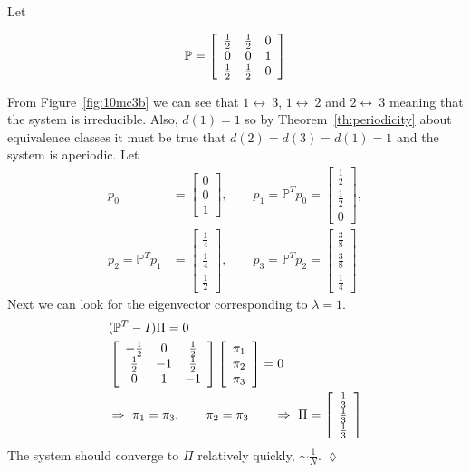 \begin{example}
Let

\begin{equation*}
\mathbb{P} = \left[\begin{array}{c c c} \frac{1}{2} & \frac{1}{2} & 0 \\ 0 & 0 & 1 \\ \frac{1}{2} & \frac{1}{2} & 0 \end{array}\right]
\end{equation*}

From Figure~\ref{fig:10mc3b} we can see that $1\leftrightarrow~3$, $1\leftrightarrow~2$ and $2\leftrightarrow~3$ meaning that the system is irreducible.
Also, $d (1)=1$ so by Theorem~\ref{th:periodicity} about equivalence classes it must be true that $d (2)=d (3)=d (1)=1$ and the system is aperiodic.
Let
\begin{align*}
p_0 &= \left[\begin{array}{c} 0 \\ 0 \\ 1 \end{array}\right],
\qquad p_1 = \mathbb{P}^Tp_0 = \left[\begin{array}{c} \frac{1}{2} \\ \frac{1}{2} \\ 0 \end{array}\right], \\
p_2 = \mathbb{P}^Tp_1 &= \left[\begin{array}{c} \frac{1}{4} \\ \frac{1}{4} \\ \frac{1}{2} \end{array}\right],
\qquad p_3 = \mathbb{P}^Tp_2 = \left[\begin{array}{c} \frac{3}{8} \\ \frac{3}{8} \\ \frac{1}{4} \end{array}\right]
\end{align*}
Next we can look for the eigenvector corresponding to $\lambda=1$.
\begin{align*}
&(\mathbb{P}^T-I)\Pi = 0 \\
&\left[\begin{array}{c c c} -\frac{1}{2} & 0 & \frac{1}{2} \\ \frac{1}{2} & -1 & \frac{1}{2} \\ 0 & 1 & -1 \end{array}\right]
\left[\begin{array}{c} \pi_1 \\ \pi_2 \\ \pi_3 \end{array}\right] = 0 \\
&\Rightarrow~\pi_1=\pi_3, \qquad \pi_2=\pi_3 \qquad \Rightarrow~\Pi=\left[\begin{array}{c} \frac{1}{3} \\ \frac{1}{3} \\ \frac{1}{3} \end{array}\right]
\end{align*}
The system should converge to $\Pi$ relatively quickly, $\sim\frac{1}{N}$.
$\lozenge$
\end{example}

